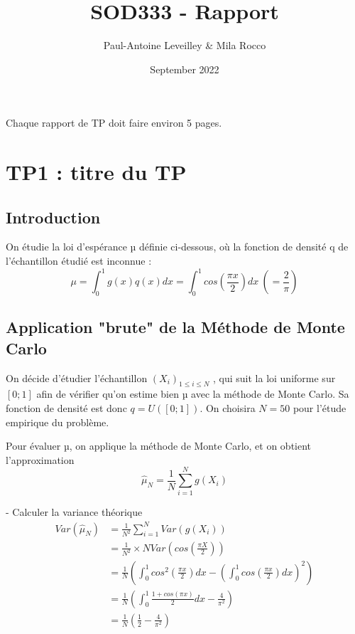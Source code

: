 \documentclass{article}
\title{SOD333 - Rapport}
\author{Paul-Antoine Leveilley \& Mila Rocco}
\date{September 2022}
\begin{document}
\maketitle

\begin{center}
Chaque rapport de TP doit faire environ 5 pages.
\end{center}







\newpage
\section{TP1 : titre du TP}

\subsection{Introduction}
On étudie la loi d'espérance µ définie ci-dessous, où la fonction de densité q de l'échantillon étudié est inconnue :
$$\mu = \int_0^1 g(x)q(x)dx = \int_0^1 cos(\frac{\pi x}{2})dx\ (=\frac{2}{\pi})$$

 \subsection{Application "brute" de la Méthode de Monte Carlo}
On décide d'étudier l'échantillon $(X_i)_{1\leq i \leq N}$ , qui suit la loi uniforme sur $[0;1]$ afin de vérifier qu'on estime bien µ avec la méthode de Monte Carlo. Sa fonction de densité est donc $q=U([0;1])$. On choisira $N=50$ pour l'étude empirique du problème.

Pour évaluer µ, on applique la méthode de Monte Carlo, et on obtient l'approximation 
$$\hat{\mu}_N = \frac{1}{N} \sum_{i=1}^N g(X_i)$$

- Calculer la variance théorique\\
\begin{align*} 
  Var(\hat{\mu}_N) &= \frac1{N^2} \sum_{i=1}^N Var(g(X_i))\\ 
  &= \frac1{N^2}\times N Var(cos(\frac{\pi X}2)) \\ 
  &= \frac1{N} \left ( \int_0^1 cos^2(\frac{\pi x}2)dx - \left ( \int_0^1 cos(\frac{\pi x}2)dx \right )^2 \right )\\
  &= \frac1{N} \left ( \int_0^1 \frac{1+cos(\pi x)}{2}dx - 
   \frac4{\pi^2} \right )\\
  &= \frac1{N} \left ( \frac{1}{2} - 
   \frac4{\pi^2} \right )\\
\end{align*}
\end{document}
